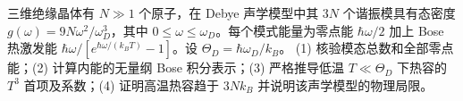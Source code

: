 三维绝缘晶体有 \(N\gg1\) 个原子，在 Debye 声学模型中其 \(3N\) 个谐振模具有态密度 \(g(\omega)=9N\omega^2/\omega_D^3\)，其中 \(0\le\omega\le\omega_D\)。每个模式能量为零点能 \(\hbar\omega/2\) 加上 Bose 热激发能 \(\hbar\omega/[e^{\hbar\omega/(k_BT)}-1]\)。设 \(\Theta_D=\hbar\omega_D/k_B\)。
(1) 核验模态总数和全部零点能；(2) 计算内能的无量纲 Bose 积分表示；(3) 严格推导低温 \(T\ll\Theta_D\) 下热容的 \(T^3\) 首项及系数；(4) 证明高温热容趋于 \(3Nk_B\) 并说明该声学模型的物理局限。
